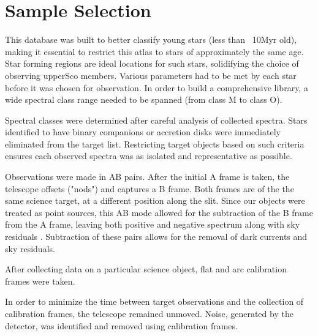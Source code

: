 \section{Sample Selection}

This database was built to better classify young stars (less than ~10Myr old), making it essential to restrict this atlas to stars of approximately the same age.  
Star forming regions are ideal locations for such stars, solidifying the choice of observing upperSco members.  Various parameters had to be met by each star before it was chosen for observation.  In order to build a comprehensive library, a wide spectral class range needed to be spanned (from class M to class O).  




Spectral classes were determined after careful analysis of collected spectra.  Stars identified to have binary companions \cite{binary_guy} or accretion disks \cite{binary_guy} were immediately eliminated from the target list.
Restricting target objects based on such criteria ensures each observed spectra was as isolated and representative as possible.


Observations were made in AB pairs.  After the initial A frame is taken, the telescope offsets ("nods") and captures a B frame.  Both frames are of the the same science target, at a different position along the slit.  Since our objects were treated as point sources, this AB mode allowed for the subtraction of the B frame from the A frame, leaving both positive and negative spectrum along with sky residuals \cite{Cushing_2004}. Subtraction of these pairs allows for the removal of dark currents and sky residuals.



After collecting data on a particular science object, flat and arc calibration frames were taken.  

In order to minimize the time between target observations and the collection of calibration frames, the telescope remained unmoved.  Noise, generated by the detector, was identified and removed using calibration frames.